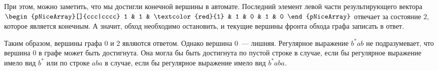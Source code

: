 \begin{minipage}{0.45\textwidth}
    \begin{center}
    \end{center}
\end{minipage}
\begin{minipage}{0.45\textwidth}
    \begin{center}
    \end{center}
\end{minipage}

При этом, можно заметить, что мы достигли конечной вершины в автомате.
Последний элемент левой части результирующего вектора
$\begin{pNiceArray}[]{ccc|cccc}
        1 & 1 & \textcolor{red}{1} & 1 & 0 & 1 & 0
    \end{pNiceArray}$
отвечает за состояние 2, которое является конечным.
А значит, обход необходимо остановить, и текущие вершины фронта обхода графа записать в ответ.

Таким образом, вершины графа 0 и 2 являются ответом.
Однако вершина 0~--- лишняя.
Регулярное выражение $b^*ab$ не подразумевает, что вершина 0 в графе может быть достигнута.
Она могла бы быть достигнута по пустой строке в случае, если бы регулярное выражение имело вид $b^*$ или по строке $aba$ в случае, если бы регулярное выражение имело вид $b^*aba$.

